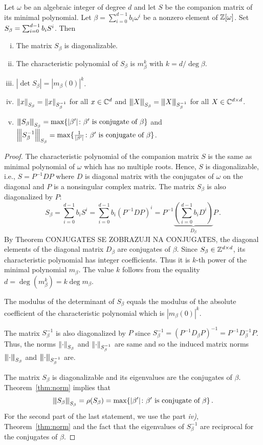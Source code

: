 \begin{lem}
\label{lem:propertiesSbeta}
Let $\omega$ be an algebraic integer of degree $d$ and let $S$ be the companion matrix of its minimal polynomial. Let $\beta=\sum_{i=0}^{d-1} b_i \omega^i$ be a nonzero element of $\mathbb{Z}[\omega]$. Set $S_\beta=\sum_{i=0}^{d-1} {b}_i S^i$. Then
\begin{enumerate}[i)]
   \item The matrix $S_\beta$ is diagonalizable.
   \item The characteristic polynomial of $S_\beta$ is $m_\beta^k$ with $k=d / \deg \beta$.
   \item $|\det S_\beta|=|m_\beta(0)|^k$.
   \item $\left\lVert x\right\rVert_{S_\beta}=\left\lVert x\right\rVert_{S_\beta^{-1}}$ for all $x \in \mathbb{C}^d$ and ${\left\vert\kern-0.25ex\left\vert\kern-0.25ex\left\vert X\right\vert\kern-0.25ex\right\vert\kern-0.25ex\right\vert}_{S_\beta}={\left\vert\kern-0.25ex\left\vert\kern-0.25ex\left\vert X\right\vert\kern-0.25ex\right\vert\kern-0.25ex\right\vert}_{S_\beta^{-1}}$ for all $X \in \mathbb{C}^{d\times d}$.
   \item ${\left\vert\kern-0.25ex\left\vert\kern-0.25ex\left\vert S_\beta\right\vert\kern-0.25ex\right\vert\kern-0.25ex\right\vert}_{S_\beta}=\max \{|\beta'| \colon \beta' \text{ is conjugate of } \beta\}$ and $ {\left\vert\kern-0.25ex\left\vert\kern-0.25ex\left\vert S_\beta^{-1}\right\vert\kern-0.25ex\right\vert\kern-0.25ex\right\vert}_{S_\beta}=\max \{\frac{1}{|\beta'|} \colon \beta' \text{ is conjugate of } \beta\}$.
\end{enumerate}  
\end{lem}
\begin{proof}
The characteristic polynomial of the companion matrix $S$ is the same as minimal polynomial of $\omega$ which has no multiple roots.  Hence, $S$ is diagonalizable, i.e., $S=P^{-1}DP$ where $D$ is diagonal matrix with the conjugates of $\omega$ on the diagonal and $P$ is a nonsingular complex matrix. The matrix $S_\beta$ is also diagonalized by $P$:
$$
S_\beta=\sum_{i=0}^{d-1} b_i S^i= \sum_{i=0}^{d-1} b_i \left(P^{-1}DP\right)^i=P^{-1}\underbrace{\left(\sum_{i=0}^{d-1} b_i D^i\right)}_{D_\beta}P\,.
$$
By Theorem CONJUGATES SE ZOBRAZUJI NA CONJUGATES, the diagonal elements of the diagonal matrix $D_\beta$ are conjugates of $\beta$. Since $S_\beta\in\mathbb{Z}^{d\times d}$, its characteristic polynomial has integer coefficients. Thus it is $k$-th power of the minimal polynomial $m_\beta$. The value $k$ follows from the equality $d=\deg(m_\beta^k)=k \deg m_\beta$. 

The modulus of the determinant of $S_\beta$ equals the modulus of the absolute coefficient of the characteristic polynomial which is $|m_\beta(0)|^k$.

The matrix $S_\beta^{-1}$ is also diagonalized by $P$ since $S_\beta^{-1}=(P^{-1}D_\beta P)^{-1}=P^{-1}D_\beta^{-1}P$. Thus, the norms $\left\lVert\cdot\right\rVert_{S_\beta}$ and $\left\lVert\cdot\right\rVert_{S_\beta^{-1}}$ are same and so the induced matrix norms ${\left\vert\kern-0.25ex\left\vert\kern-0.25ex\left\vert \cdot\right\vert\kern-0.25ex\right\vert\kern-0.25ex\right\vert}_{S_\beta}$ and ${\left\vert\kern-0.25ex\left\vert\kern-0.25ex\left\vert \cdot\right\vert\kern-0.25ex\right\vert\kern-0.25ex\right\vert}_{S_\beta^{-1}}$ are.

The matrix $S_\beta$ is diagonalizable and its eigenvalues are the conjugates of $\beta$. Theorem~\ref{thm:norm} implies that 
$$
{\left\vert\kern-0.25ex\left\vert\kern-0.25ex\left\vert S_\beta\right\vert\kern-0.25ex\right\vert\kern-0.25ex\right\vert}_{S_\beta}=\rho(S_\beta)= \max \{|\beta'| \colon \beta' \text{ is conjugate of } \beta\}\,. 
$$
For the second part of the last statement, we use the part \textit{iv)}, Theorem~\ref{thm:norm} and the fact that the eigenvalues of $S_\beta^{-1}$ are  reciprocal for the conjugates of $\beta$.
\end{proof}

